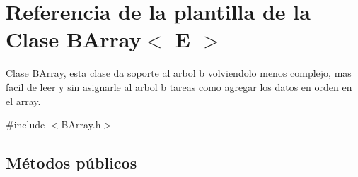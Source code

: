 \hypertarget{classBArray}{\section{Referencia de la plantilla de la Clase B\-Array$<$ E $>$}
\label{classBArray}
}


Clase \hyperlink{classBArray}{B\-Array}, esta clase da soporte al arbol b volviendolo menos complejo, mas facil de leer y sin asignarle al arbol b tareas como agregar los datos en orden en el array.  




{\ttfamily \#include $<$B\-Array.\-h$>$}

\subsection*{Métodos públicos}

